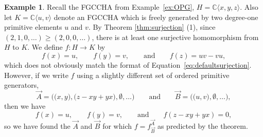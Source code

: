 \documentclass[11pt]{amsart}
\theoremstyle{definition}
\newtheorem{example}[theorem]{Example}
\numberwithin{equation}{section}
\def\CC{{\mathbb C}}
\newcommand{\FGCCHA}{\textsf{FGCCHA}\xspace}
\begin{document}
\begin{example}
\label{ex:quotientHopf}
Recall the \FGCCHA from Example~\ref{ex:OPG}, $H = \CC\langle x, y, z \rangle$.
Also let $K = \CC\langle u, v \rangle$ denote an \FGCCHA
which is freely generated by two degree-one primitive elements $u$ and $v$. 
By Theorem \ref{thm:surjection} (1), since $(2,1,0,\ldots) \geq (2,0,0,\ldots)$,
there is at least one surjective homomorphism from $H$ to $K$.  
We define $f: H \to K$ by
\[
f(x) = u,
\qquad
f(y) = v,
\qquad\text{and}\qquad
f(z) = uv-vu,
\]
which does not obviously match the format of Equation~\eqref{eq:defaultsurjection}.  However, if we write $f$ using a slightly different set of ordered primitive generators,
\[
\vec{A} = \Big(\big( x, y\big), \big( z - xy + yx \big), \emptyset, \ldots \Big)
\qquad
\text{and}
\qquad
\vec{B} =  \Big(\big( u, v\big), \emptyset, \ldots \Big),
\]
then we have 
\[
f(x) = u,
\qquad
f(y) = v,
\qquad\text{and}\qquad
f(z - xy + yx) = 0,
\]
so we have found the $\vec{A}$ and $\vec{B}$ for which $f = f^{\vec{A}}_{\vec{B}}$ as predicted by the theorem.
\end{example}
\end{document}
